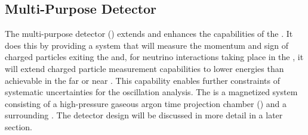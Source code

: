 
\subsection{Multi-Purpose Detector}
\label{sec:appx-nd:mpd}
The multi-purpose detector () extends and enhances the capabilities of the .  It does this by providing a system that will measure the momentum and sign of charged particles exiting the  and, for neutrino interactions taking place in the , it will extend charged particle measurement capabilities to lower energies than achievable in the far or near . This capability enables further constraints of systematic uncertainties for the  oscillation analysis.  
The  is a magnetized system consisting of a high-pressure gaseous argon time projection chamber () and a surrounding . The detector design will be discussed in more detail in a later section.
 
 
 
 
